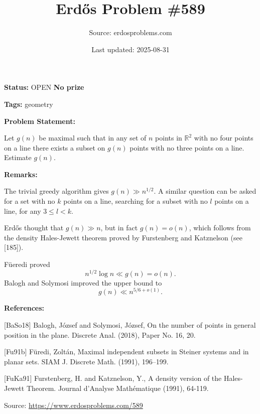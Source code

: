 \documentclass{article}
\title{Erd\H{o}s Problem \#589}
\date{Last updated: 2025-08-31}
\author{Source: erdosproblems.com}
\begin{document}
\maketitle

\noindent\textbf{Status:} OPEN \quad \textbf{No prize}

\noindent\textbf{Tags:} geometry

\medskip
\noindent\textbf{Problem Statement:}

Let $g(n)$ be maximal such that in any set of $n$ points in $\mathbb{R}^2$ with no four points on a line there exists a subset on $g(n)$ points with no three points on a line. Estimate $g(n)$.

\bigskip
\noindent\textbf{Remarks:}

The trivial greedy algorithm gives $g(n)\gg n^{1/2}$. A similar question can be asked for a set with no $k$ points on a line, searching for a subset with no $l$ points on a line, for any $3\leq l<k$.

Erd\H{o}s thought that $g(n) \gg n$, but in fact $g(n)=o(n)$, which follows from the density Hales-Jewett theorem proved by Furstenberg and Katznelson \cite{FuKa91} (see [185]).

F\"{u}eredi \cite{Fu91b} proved\[n^{1/2}\log n\ll g(n)=o(n).\]Balogh and Solymosi \cite{BaSo18} improved the upper bound to\[g(n) \ll n^{5/6+o(1)}.\]

\bigskip
\noindent\textbf{References:}

[BaSo18] Balogh, J\'{o}zsef and Solymosi, J\'{o}zsef, On the number of points in general position in the plane. Discrete Anal. (2018), Paper No. 16, 20.
 
 [Fu91b] F\"{u}redi, Zolt\'{a}n, Maximal independent subsets in Steiner systems and in planar
sets. SIAM J. Discrete Math. (1991), 196--199.
 
 [FuKa91] Furstenberg, H. and Katznelson, Y., A density version of the Hales-Jewett Theorem. Journal d'Analyse Math\'{e}matique (1991), 64-119.

\bigskip
\noindent\small{Source: \url{https://www.erdosproblems.com/589}}
\end{document}
